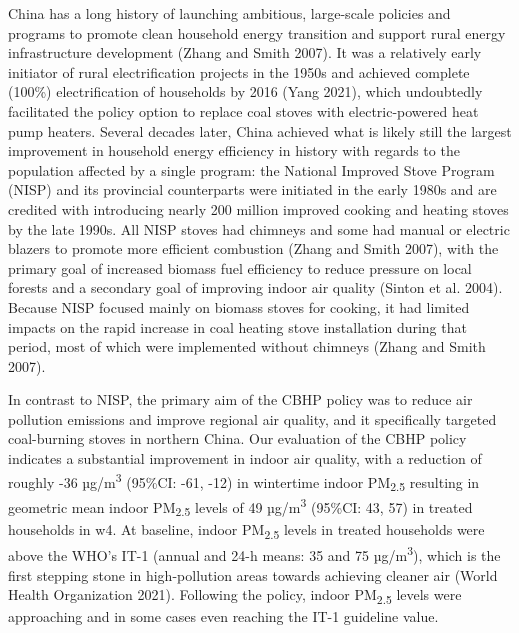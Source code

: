\documentclass[
  letterpaper,
  DIV=11,
  numbers=noendperiod]{scrartcl}
\begin{document}
China has a long history of launching ambitious, large-scale policies
and programs to promote clean household energy transition and support
rural energy infrastructure development (Zhang and Smith 2007). It was a
relatively early initiator of rural electrification projects in the
1950s and achieved complete (100\%) electrification of households by
2016 (Yang 2021), which undoubtedly facilitated the policy option to
replace coal stoves with electric-powered heat pump heaters. Several
decades later, China achieved what is likely still the largest
improvement in household energy efficiency in history with regards to
the population affected by a single program: the National Improved Stove
Program (NISP) and its provincial counterparts were initiated in the
early 1980s and are credited with introducing nearly 200 million
improved cooking and heating stoves by the late 1990s. All NISP stoves
had chimneys and some had manual or electric blazers to promote more
efficient combustion (Zhang and Smith 2007), with the primary goal of
increased biomass fuel efficiency to reduce pressure on local forests
and a secondary goal of improving indoor air quality (Sinton et al.
2004). Because NISP focused mainly on biomass stoves for cooking, it had
limited impacts on the rapid increase in coal heating stove installation
during that period, most of which were implemented without chimneys
(Zhang and Smith 2007).

In contrast to NISP, the primary aim of the CBHP policy was to reduce
air pollution emissions and improve regional air quality, and it
specifically targeted coal-burning stoves in northern China. Our
evaluation of the CBHP policy indicates a substantial improvement in
indoor air quality, with a reduction of roughly -36
µg/m\textsuperscript{3} (95\%CI: -61, -12) in wintertime indoor
PM\textsubscript{2.5} resulting in geometric mean indoor
PM\textsubscript{2.5} levels of 49 µg/m\textsuperscript{3} (95\%CI: 43,
57) in treated households in w4. At baseline, indoor
PM\textsubscript{2.5} levels in treated households were above the WHO's
IT-1 (annual and 24-h means: 35 and 75 µg/m\textsuperscript{3}), which
is the first stepping stone in high-pollution areas towards achieving
cleaner air (World Health Organization 2021). Following the policy,
indoor PM\textsubscript{2.5} levels were approaching and in some cases
even reaching the IT-1 guideline value.
\end{document}
